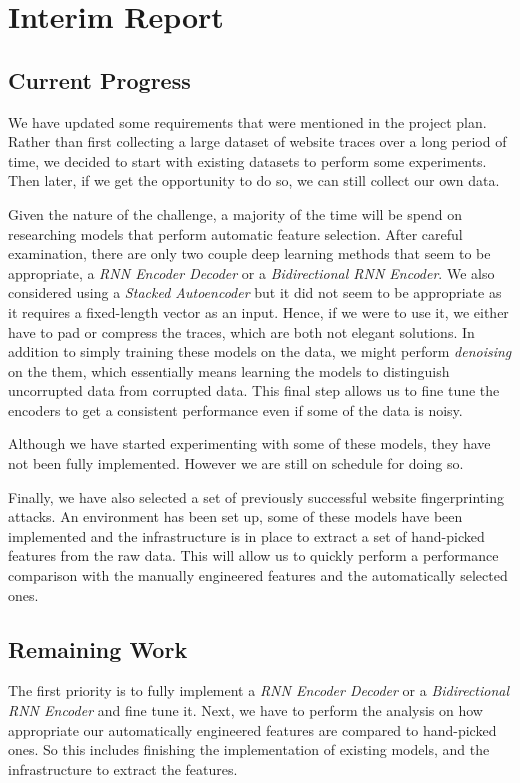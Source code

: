 \newpage
\section{Interim Report}

\begingroup

\renewcommand{\thesubsection}{\arabic{subsection}}

\renewcommand{\addcontentsline}[3]{}%

\subsection{Current Progress}
We have updated some requirements that were mentioned in the project plan.
Rather than first collecting a large dataset of website traces over a long period of time,
we decided to start with existing datasets to perform some experiments. Then later, if we get the opportunity to do so, we can still collect our own data.

Given the nature of the challenge, a majority of the time will be spend on researching models that perform automatic feature selection.
After careful examination, there are only two couple deep learning methods that seem to be appropriate, a \textit{RNN Encoder Decoder} or a \textit{Bidirectional RNN Encoder}.
We also considered using a \textit{Stacked Autoencoder}  but it did not seem to be appropriate as it requires a fixed-length vector as an input.
Hence, if we were to use it, we either have to pad or compress the traces, which are both not elegant solutions.
In addition to simply training these models on the data, we might perform \textit{denoising} on the them, which essentially means learning the models to distinguish uncorrupted data from corrupted data.
This final step allows us to fine tune the encoders to get a consistent performance even if some of the data is noisy.

Although we have started experimenting with some of these models, they have not been fully implemented.
However we are still on schedule for doing so.

Finally, we have also selected a set of previously successful website fingerprinting attacks.
An environment has been set up, some of these models have been implemented and the infrastructure is in place to extract a set of hand-picked features from the raw data.
This will allow us to quickly perform a performance comparison with the manually engineered features and the automatically selected ones.

\subsection{Remaining Work}
The first priority is to fully implement a \textit{RNN Encoder Decoder} or a \textit{Bidirectional RNN Encoder} and fine tune it.
Next, we have to perform the analysis on how appropriate our automatically engineered features are compared to hand-picked ones.
So this includes finishing the implementation of existing models, and the infrastructure to extract the features.

